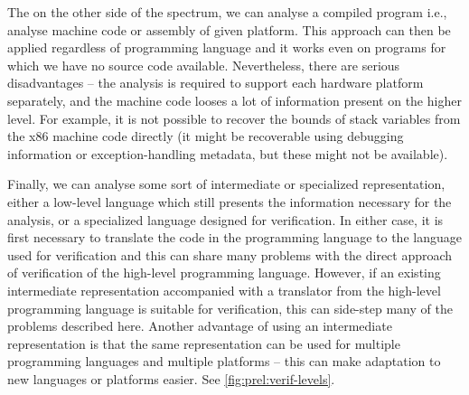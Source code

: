 
The on the other side of the spectrum, we can analyse a compiled program i.e., analyse machine code or assembly of given platform.
This approach can then be applied regardless of programming language and it works even on programs for which we have no source code available.
Nevertheless, there are serious disadvantages -- the analysis is required to support each hardware platform separately, and the machine code looses a lot of information present on the higher level.
For example, it is not possible to recover the bounds of stack variables from the x86 machine code directly (it might be recoverable using debugging information or exception-handling metadata, but these might not be available).

Finally, we can analyse some sort of intermediate or specialized representation, either a low-level language which still presents the information necessary for the analysis, or a specialized language designed for verification.
In either case, it is first necessary to translate the code in the programming language to the language used for verification and this can share many problems with the direct approach of verification of the high-level programming language.
However, if an existing intermediate representation accompanied with a translator from the high-level programming language is suitable for verification, this can side-step many of the problems described here.
Another advantage of using an intermediate representation is that the same representation can be used for multiple programming languages and multiple platforms -- this can make adaptation to new languages or platforms easier.
See \autoref{fig:prel:verif-levels}.

